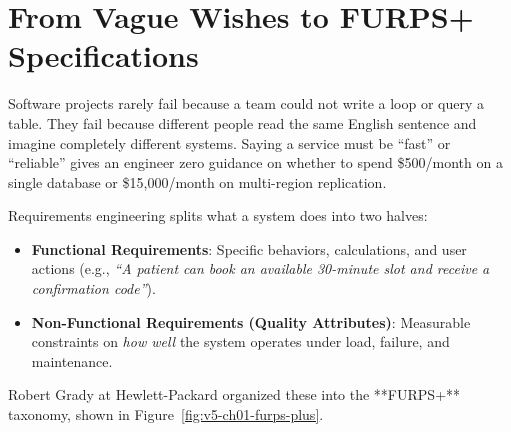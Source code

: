 \section{From Vague Wishes to FURPS+ Specifications}

Software projects rarely fail because a team could not write a loop or query a table. They fail because different people read the same English sentence and imagine completely different systems. Saying a service must be ``fast'' or ``reliable'' gives an engineer zero guidance on whether to spend \$500/month on a single database or \$15,000/month on multi-region replication.

Requirements engineering splits what a system does into two halves:
\begin{itemize}[leftmargin=18pt]
  \item \textbf{Functional Requirements}: Specific behaviors, calculations, and user actions (e.g., \textit{``A patient can book an available 30-minute slot and receive a confirmation code''}).
  \item \textbf{Non-Functional Requirements (Quality Attributes)}: Measurable constraints on \emph{how well} the system operates under load, failure, and maintenance.
\end{itemize}

Robert Grady at Hewlett-Packard organized these into the **FURPS+** taxonomy, shown in Figure~\ref{fig:v5-ch01-furps-plus}.

